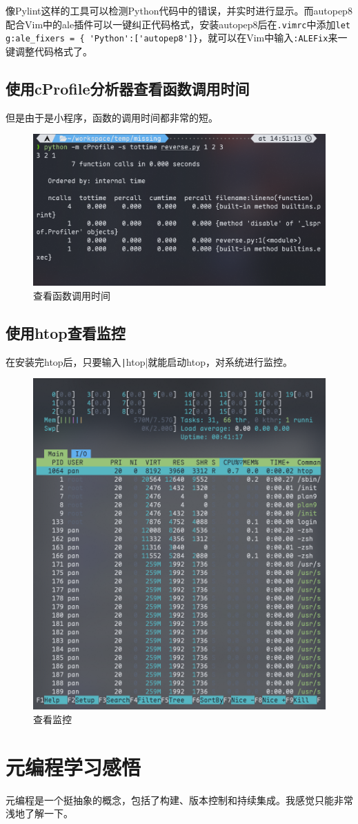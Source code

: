 \documentclass[fontset=ubuntu]{ctexart}
\begin{document}
像Pylint这样的工具可以检测Python代码中的错误，并实时进行显示。而autopep8配合Vim中的ale插件可以一键纠正代码格式，安装autopep8后在\verb|.vimrc|中添加\verb|let g:ale_fixers = { 'Python':['autopep8']}|，就可以在Vim中输入\verb|:ALEFix|来一键调整代码格式了。

\subsection{使用cProfile分析器查看函数调用时间}
但是由于是小程序，函数的调用时间都非常的短。
\begin{figure}[htb]
    \centering
    \includegraphics[width=0.5\linewidth]{cProfile_1.png}
    \caption{查看函数调用时间}
    \label{fig:cProfile_1}
\end{figure}

\subsection{使用htop查看监控}
在安装完htop后，只要输入\texttt|htop|就能启动htop，对系统进行监控。
\begin{figure}[htb]
    \centering
    \includegraphics[width=0.5\linewidth]{htop_1.png}
    \caption{查看监控}
    \label{fig:htop_1}
\end{figure}

\section{元编程学习感悟}
元编程是一个挺抽象的概念，包括了构建、版本控制和持续集成。我感觉只能非常浅地了解一下。
\end{document}
